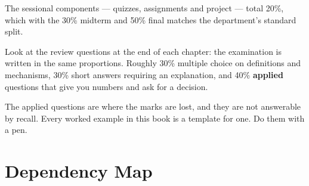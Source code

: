 The sessional components --- quizzes, assignments and project --- total 20\%,
which with the 30\% midterm and 50\% final matches the department's standard
split.

\begin{alertbox}
Look at the review questions at the end of each chapter: the examination is
written in the same proportions. Roughly 30\% multiple choice on definitions
and mechanisms, 30\% short answers requiring an explanation, and 40\%
\textbf{applied} questions that give you numbers and ask for a decision.

\smallskip
The applied questions are where the marks are lost, and they are not answerable
by recall. Every worked example in this book is a template for one. Do them with
a pen.
\end{alertbox}

\section{Dependency Map}

